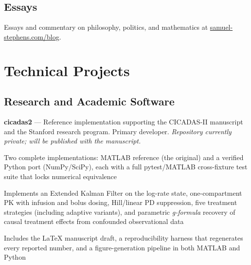 \documentclass[11pt,letterpaper]{report} %
\newcommand{\listitemspace}{0.25em}
\renewenvironment{itemize}
{\begin{list}{}{\setlength{\leftmargin}{0em}
                \setlength{\parskip}{0em}
                \setlength{\itemsep}{\listitemspace}
                \setlength{\parsep}{\listitemspace}}}
{\end{list}}
\begin{document}
    \subsection*{Essays}
    Essays and commentary on philosophy, politics, and mathematics at \href{https://www.samuel-stephens.com/blog}{samuel-stephens.com/blog}.

    \section*{Technical Projects}
    \subsection*{Research and Academic Software}
    \begin{tablist}
        \item[2025--]   \tab{}\textbf{cicadas2} --- Reference implementation supporting the CICADAS-II manuscript and the Stanford research program. Primary developer. \textit{Repository currently private; will be published with the manuscript.}
    \end{tablist}
    \begin{itemize}
        \item Two complete implementations: MATLAB reference (the original) and a verified Python port (NumPy/SciPy), each with a full pytest/MATLAB cross-fixture test suite that locks numerical equivalence
        \item Implements an Extended Kalman Filter on the log-rate state, one-compartment PK with infusion and bolus dosing, Hill/linear PD suppression, five treatment strategies (including adaptive variants), and parametric \textit{g-formula} recovery of causal treatment effects from confounded observational data
        \item Includes the \LaTeX{} manuscript draft, a reproducibility harness that regenerates every reported number, and a figure-generation pipeline in both MATLAB and Python
    \end{itemize}
\end{document}
